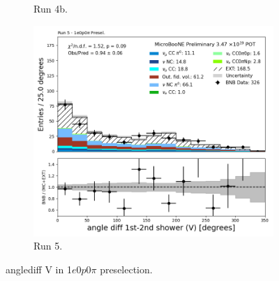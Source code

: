\begin{figure}[H]
\begin{subfigure}[t]{0.32\linewidth}
        \caption{Run 4b.}
    \end{subfigure}%
    \hspace{0.2cm}%
    \begin{subfigure}[t]{0.32\linewidth}
        \includegraphics[width=\linewidth]{technote/Appendix_Preselection/Figures/1e0p0pi/Run5/anglediff_V_Run5_1e0p0pi_Presel.png}
        \caption{Run 5.}
    \end{subfigure}
    \caption{anglediff V in 1$e$0$p$0$\pi$ preselection.}
\end{figure}

